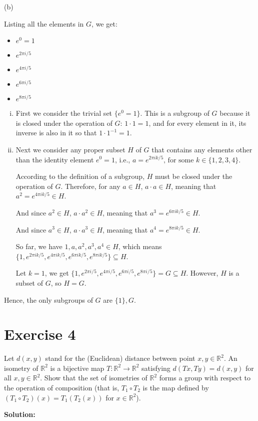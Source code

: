 \documentclass{article}
\begin{document}
(b)

Listing all the elements in $G$, we get:

\begin{itemize}
\item $e^0 = 1$
\item $e^{2\pi i/5}$
\item $e^{4\pi i/5}$
\item $e^{6\pi i/5}$
\item $e^{8\pi i/5}$
\end{itemize}

\begin{enumerate}[(i)]
\item First we consider the trivial set $\{e^0 = 1\}$. This is a subgroup of $G$ because it is closed under the operation of $G$: $1 \cdot 1 = 1$, and for every element in it, its inverse is also in it so that $1 \cdot 1^{-1} = 1$.

\item Next we consider any proper subset $H$ of $G$ that contains any elements other than the identity element $e^0 = 1$, i.e., $a = e^{2\pi i k/5} \text{, for some } k \in \{1,2,3,4\}$.

According to the definition of a subgroup, $H$ must be closed under the operation of $G$. Therefore, for any $a \in H$, $a \cdot a \in H$, meaning that $a^2 = e^{4\pi i k/5} \in H$.

And since $a^2 \in H$, $a \cdot a^2 \in H$, meaning that $a^3 = e^{6\pi i k/5} \in H$.

And since $a^3 \in H$, $a \cdot a^3 \in H$, meaning that $a^4 = e^{8\pi i k/5} \in H$.

So far, we have $1, a, a^2, a^3, a^4 \in H$, which means $\{1, e^{2\pi i k/5}, e^{4\pi i k/5}, e^{6\pi i k/5}, e^{8\pi i k/5}\} \subseteq H$.

Let $k=1$, we get $\{1, e^{2\pi i/5}, e^{4\pi i/5}, e^{6\pi i/5}, e^{8\pi i/5}\} = G \subseteq H$. However, $H$ is a subset of $G$, so $H=G$.

\end{enumerate}

Hence, the only subgroups of $G$ are $\{1\}, G$.

\newpage

\section*{Exercise 4}

Let $d(x,y)$ stand for the (Euclidean) distance between point $x,y \in \mathbb{R}^2$. An isometry of $\mathbb{R}^2$ is a bijective map $T: \mathbb{R}^2 \to \mathbb{R}^2$ satisfying $d(Tx,Ty)=d(x,y)$ for all $x,y \in \mathbb{R}^2$. Show that the set of isometries of $\mathbb{R}^2$ forms a group with respect to the operation of composition (that is, $T_1 \circ T_2$ is the map defined by $(T_1 \circ T_2)(x)=T_1(T_2(x))$ for $x \in \mathbb{R}^2$).

\textbf{Solution:}
\end{document}

